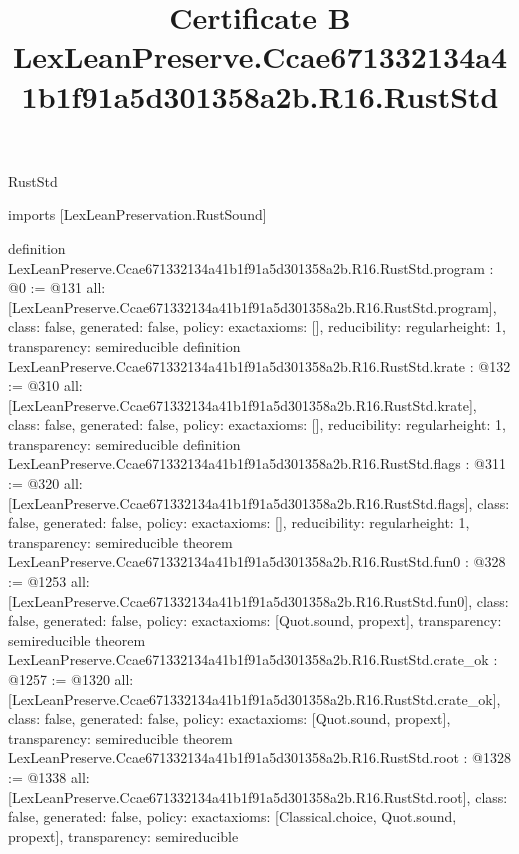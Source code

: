 \begin{lexlean}{RustStd}
\title{Certificate B LexLeanPreserve.Ccae671332134a41b1f91a5d301358a2b.R16.RustStd}
\begin{coremodule}
imports [LexLeanPreservation.RustSound]

definition LexLeanPreserve.Ccae671332134a41b1f91a5d301358a2b.R16.RustStd.program : @0 := @131 {
  all: [LexLeanPreserve.Ccae671332134a41b1f91a5d301358a2b.R16.RustStd.program],
  class: false,
  generated: false,
  policy: exact{axioms: []},
  reducibility: regular{height: 1},
  transparency: semireducible
}
definition LexLeanPreserve.Ccae671332134a41b1f91a5d301358a2b.R16.RustStd.krate : @132 := @310 {
  all: [LexLeanPreserve.Ccae671332134a41b1f91a5d301358a2b.R16.RustStd.krate],
  class: false,
  generated: false,
  policy: exact{axioms: []},
  reducibility: regular{height: 1},
  transparency: semireducible
}
definition LexLeanPreserve.Ccae671332134a41b1f91a5d301358a2b.R16.RustStd.flags : @311 := @320 {
  all: [LexLeanPreserve.Ccae671332134a41b1f91a5d301358a2b.R16.RustStd.flags],
  class: false,
  generated: false,
  policy: exact{axioms: []},
  reducibility: regular{height: 1},
  transparency: semireducible
}
theorem LexLeanPreserve.Ccae671332134a41b1f91a5d301358a2b.R16.RustStd.fun0 : @328 := @1253 {
  all: [LexLeanPreserve.Ccae671332134a41b1f91a5d301358a2b.R16.RustStd.fun0],
  class: false,
  generated: false,
  policy: exact{axioms: [Quot.sound, propext]},
  transparency: semireducible
}
theorem LexLeanPreserve.Ccae671332134a41b1f91a5d301358a2b.R16.RustStd.crate_ok : @1257 := @1320 {
  all: [LexLeanPreserve.Ccae671332134a41b1f91a5d301358a2b.R16.RustStd.crate_ok],
  class: false,
  generated: false,
  policy: exact{axioms: [Quot.sound, propext]},
  transparency: semireducible
}
theorem LexLeanPreserve.Ccae671332134a41b1f91a5d301358a2b.R16.RustStd.root : @1328 := @1338 {
  all: [LexLeanPreserve.Ccae671332134a41b1f91a5d301358a2b.R16.RustStd.root],
  class: false,
  generated: false,
  policy: exact{axioms: [Classical.choice, Quot.sound, propext]},
  transparency: semireducible
}


\end{coremodule}
\end{lexlean}
